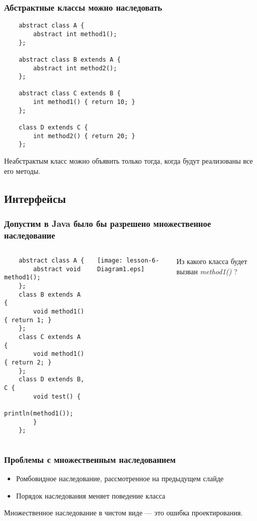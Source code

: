\begin{frame}[fragile]
	\frametitle{Абстрактные классы можно наследовать}
	\begin{verbatim}
	abstract class A {
	    abstract int method1();
	};

	abstract class B extends A {
	    abstract int method2();
	};

	abstract class C extends B {
	    int method1() { return 10; }
	};

	class D extends C {
	    int method2() { return 20; }
	};
	\end{verbatim}

	Неабстрактым класс можно объявить только тогда, когда будут реализованы все его методы.
\end{frame}

\subsection{Интерфейсы}
\begin{frame}[fragile]
	\frametitle{Допустим в Java было бы разрешено множественное наследование}

	\begin{columns}[c]
	\column{2.55in}
	\begin{verbatim}
	abstract class A {
	    abstract void method1();
	};
	class B extends A {
	    void method1() { return 1; }
	};
	class C extends A {
	    void method1() { return 2; }
	};
	class D extends B, C {
	    void test() {
	        println(method1());
	    }
	};
	\end{verbatim}
	\column{1.90in}
	\texttt{[image: lesson-6-Diagram1.eps]}

	\smallskip
	Из какого класса будет вызван \emph{method1()} ?
	\end{columns}
\end{frame}

\begin{frame}[fragile]
	\frametitle{Проблемы с множественным наследованием}
	\begin{large}
	\begin{itemize}
	\item{Ромбовидное наследование, рассмотренное на предыдущем слайде}
	\item{Порядок наследования меняет поведение класса}
	\end{itemize}

	Множественное наследование в чистом виде --- это ошибка проектирования.
	\end{large}
\end{frame}


